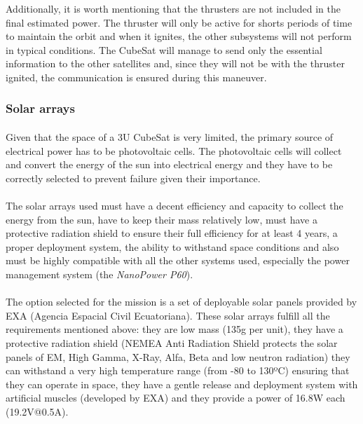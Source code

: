 Additionally, it is worth mentioning that the thrusters are not included in the final estimated power. The thruster will only be active for shorts periods of time to maintain the orbit and when it ignites, the other subsystems will not perform in typical conditions. The CubeSat will manage to send only the essential information to the other satellites and, since they will not be with the thruster ignited, the communication is ensured during this maneuver.

\subsubsection{Solar arrays}

\paragraph{}Given that the space of a 3U CubeSat is very limited, the primary source of electrical power has to be photovoltaic cells. The photovoltaic cells will collect and convert the energy of the sun into electrical energy and they have to be correctly selected to prevent failure given their importance. 

\paragraph{}The solar arrays used must have a decent efficiency and capacity to collect the energy from the sun, have to keep their mass relatively low, must have a protective radiation shield to ensure their full efficiency for at least 4 years, a proper deployment system, the ability to withstand space conditions and also must be highly compatible with all the other systems used, especially the power management system (the \textit{NanoPower P60}).

\paragraph{}The option selected for the mission is a set of deployable solar panels provided by EXA (Agencia Espacial Civil Ecuatoriana). These solar arrays fulfill all the requirements mentioned above: they are low mass (135g per unit), they have a protective radiation shield (NEMEA Anti Radiation Shield protects the solar panels of EM, High Gamma, X-Ray, Alfa, Beta and low neutron radiation) they can withstand a very high temperature range (from -80 to 130ºC) ensuring that they can operate in space, they have a gentle release and deployment system with artificial muscles (developed by EXA) and they provide a power of 16.8W each (19.2V@0.5A).

